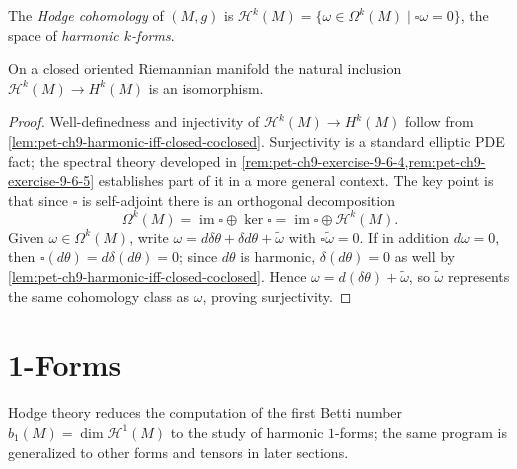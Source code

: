 \begin{definition}
  \label{def:pet-ch9-hodge-cohomology}
  The \emph{Hodge cohomology} of $(M,g)$ is
  $\mathcal{H}^k(M)=\{\omega\in\Omega^k(M)\mid\square\omega=0\}$, the space of
  \emph{harmonic $k$-forms}.
\end{definition}

\begin{theorem}[Hodge, 1935]
  \label{thm:pet-ch9-hodge-theorem}
  On a closed oriented Riemannian manifold the natural inclusion
  $\mathcal{H}^k(M)\to H^k(M)$ is an isomorphism.
\end{theorem}
\begin{proof}
  Well-definedness and injectivity of $\mathcal{H}^k(M)\to H^k(M)$ follow from
  \cref{lem:pet-ch9-harmonic-iff-closed-coclosed}. Surjectivity is a standard
  elliptic PDE fact; the spectral theory developed in
  \cref{rem:pet-ch9-exercise-9-6-4,rem:pet-ch9-exercise-9-6-5} establishes part
  of it in a more general context. The key point is that since $\square$ is
  self-adjoint there is an orthogonal decomposition
  \[
    \Omega^k(M)=\operatorname{im}\square\oplus\ker\square
    =\operatorname{im}\square\oplus\mathcal{H}^k(M).
  \]
  Given $\omega\in\Omega^k(M)$, write $\omega=d\delta\theta+\delta d\theta+\tilde\omega$
  with $\square\tilde\omega=0$. If in addition $d\omega=0$, then
  $\square(d\theta)=d\delta(d\theta)=0$; since $d\theta$ is harmonic,
  $\delta(d\theta)=0$ as well by \cref{lem:pet-ch9-harmonic-iff-closed-coclosed}.
  Hence $\omega=d(\delta\theta)+\tilde\omega$, so $\tilde\omega$ represents the
  same cohomology class as $\omega$, proving surjectivity.
\end{proof}

\section{1-Forms}

Hodge theory reduces the computation of the first Betti number
$b_1(M)=\dim\mathcal{H}^1(M)$ to the study of harmonic $1$-forms; the same
program is generalized to other forms and tensors in later sections.

